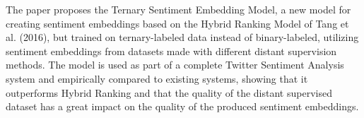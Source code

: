 The paper proposes the Ternary Sentiment Embedding Model, a new model for creating sentiment embeddings based on the Hybrid Ranking Model of Tang et al. (2016), but trained on ternary-labeled data instead of binary-labeled, utilizing sentiment embeddings from datasets made with different distant supervision methods. The model is used as part of a complete Twitter Sentiment Analysis system and empirically compared to existing systems, showing that it outperforms Hybrid Ranking and that the quality of the distant supervised dataset has a great impact on the quality of the produced sentiment embeddings.
